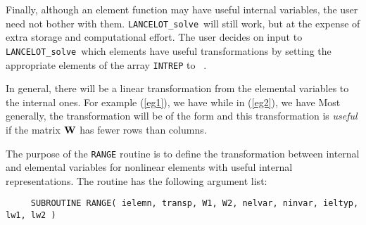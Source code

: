 \documentclass{galahad}
\newcommand{\fullpackagename}{LANC\-E\-LOT}
\newcommand{\solver}{{\tt \fullpackagename\_solve}}
\begin{document}
Finally, although an element function
may have  useful internal variables,   the user need  not  bother with
them. \solver\ will still work, but at the expense of extra storage
and computational effort.   The user decides  on input to \solver\
which elements have useful transformations
by setting the appropriate elements of the array {\tt INTREP}  to
\true\ .

In general, there will be a linear transformation from
the elemental variables to the internal ones. For example
(\ref{eg1}), we have
while in (\ref{eg2}), we have
Most generally, the transformation will be of the form
\disp{\bmu = \bmW \bmv,}
and this transformation is {\em useful} if the matrix ${\mathbf{W}}$ has
fewer rows than columns.

The purpose of the {\tt RANGE}
routine is to define the transformation
between internal and elemental variables for
nonlinear elements
with useful internal representations.
The routine has the following argument list:

\def\baselinestretch{0.8}
{\tt \begin{verbatim}
     SUBROUTINE RANGE( ielemn, transp, W1, W2, nelvar, ninvar, ieltyp, lw1, lw2 )
\end{verbatim} }
\def\baselinestretch{1.0}
\end{document}
